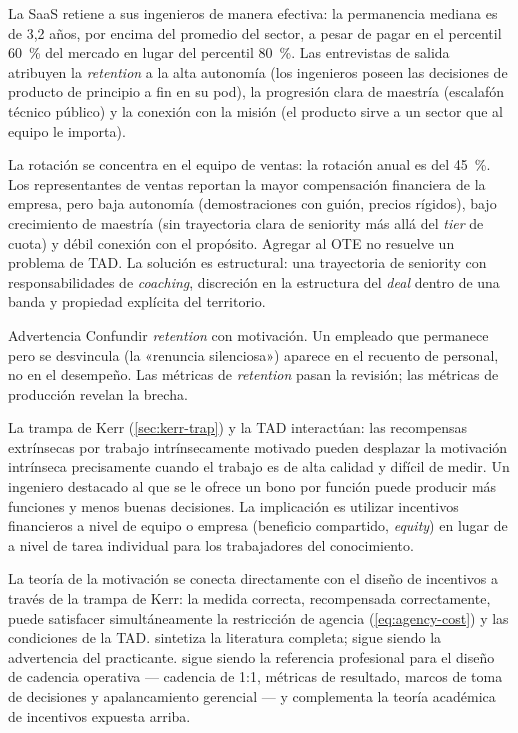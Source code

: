 \begin{example}
La SaaS retiene a sus ingenieros de manera efectiva: la permanencia mediana es de 3,2 años, por encima del promedio del sector, a pesar de pagar en el percentil \qty{60}{\percent} del mercado en lugar del percentil \qty{80}{\percent}. Las entrevistas de salida atribuyen la \emph{retention} a la alta autonomía (los ingenieros poseen las decisiones de producto de principio a fin en su pod), la progresión clara de maestría (escalafón técnico público) y la conexión con la misión (el producto sirve a un sector que al equipo le importa).

La rotación se concentra en el equipo de ventas: la rotación anual es del \qty{45}{\percent}. Los representantes de ventas reportan la mayor compensación financiera de la empresa, pero baja autonomía (demostraciones con guión, precios rígidos), bajo crecimiento de maestría (sin trayectoria clara de seniority más allá del \emph{tier} de cuota) y débil conexión con el propósito. Agregar  al OTE no resuelve un problema de TAD. La solución es estructural: una trayectoria de seniority con responsabilidades de \emph{coaching}, discreción en la estructura del \emph{deal} dentro de una banda y propiedad explícita del territorio.
\end{example}

\begin{admonition}{Advertencia}
Confundir \emph{retention} con motivación. Un empleado que permanece pero se desvincula (la «renuncia silenciosa») aparece en el recuento de personal, no en el desempeño. Las métricas de \emph{retention} pasan la revisión; las métricas de producción revelan la brecha.
\end{admonition}

La trampa de Kerr (\cref{sec:kerr-trap}) y la TAD interactúan: las recompensas extrínsecas por trabajo intrínsecamente motivado pueden desplazar la motivación intrínseca precisamente cuando el trabajo es de alta calidad y difícil de medir. Un ingeniero destacado al que se le ofrece un bono por función puede producir más funciones y menos buenas decisiones. La implicación es utilizar incentivos financieros a nivel de equipo o empresa (beneficio compartido, \emph{equity}) en lugar de a nivel de tarea individual para los trabajadores del conocimiento.

La teoría de la motivación se conecta directamente con el diseño de incentivos a través de la trampa de Kerr: la medida correcta, recompensada correctamente, puede satisfacer simultáneamente la restricción de agencia (\cref{eq:agency-cost}) y las condiciones de la TAD. \textcite{robbins2022} sintetiza la literatura completa; \textcite{kerr1975folly} sigue siendo la advertencia del practicante. \textcite{grove1995high} sigue siendo la referencia profesional para el diseño de cadencia operativa --- cadencia de 1:1, métricas de resultado, marcos de toma de decisiones y apalancamiento gerencial --- y complementa la teoría académica de incentivos expuesta arriba.

